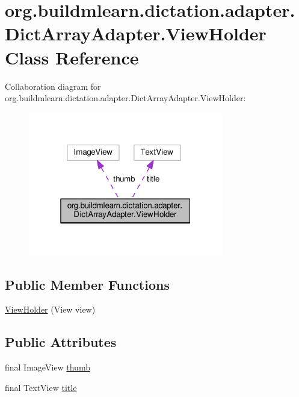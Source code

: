 \hypertarget{classorg_1_1buildmlearn_1_1dictation_1_1adapter_1_1DictArrayAdapter_1_1ViewHolder}{}\section{org.\+buildmlearn.\+dictation.\+adapter.\+Dict\+Array\+Adapter.\+View\+Holder Class Reference}
\label{classorg_1_1buildmlearn_1_1dictation_1_1adapter_1_1DictArrayAdapter_1_1ViewHolder}


Collaboration diagram for org.\+buildmlearn.\+dictation.\+adapter.\+Dict\+Array\+Adapter.\+View\+Holder\+:
\nopagebreak
\begin{figure}[H]
\begin{center}
\leavevmode
\includegraphics[width=241pt]{classorg_1_1buildmlearn_1_1dictation_1_1adapter_1_1DictArrayAdapter_1_1ViewHolder__coll__graph}
\end{center}
\end{figure}
\subsection*{Public Member Functions}
\begin{DoxyCompactItemize}
\item 
\hyperlink{classorg_1_1buildmlearn_1_1dictation_1_1adapter_1_1DictArrayAdapter_1_1ViewHolder_aaab9bbcff5f7864be29349406a576a0b}{View\+Holder} (View view)
\end{DoxyCompactItemize}
\subsection*{Public Attributes}
\begin{DoxyCompactItemize}
\item 
final Image\+View \hyperlink{classorg_1_1buildmlearn_1_1dictation_1_1adapter_1_1DictArrayAdapter_1_1ViewHolder_af5c56974be11832529ab052449ead1a9}{thumb}
\item 
final Text\+View \hyperlink{classorg_1_1buildmlearn_1_1dictation_1_1adapter_1_1DictArrayAdapter_1_1ViewHolder_a0be058842214daeff52045e4f2436e50}{title}
\end{DoxyCompactItemize}


